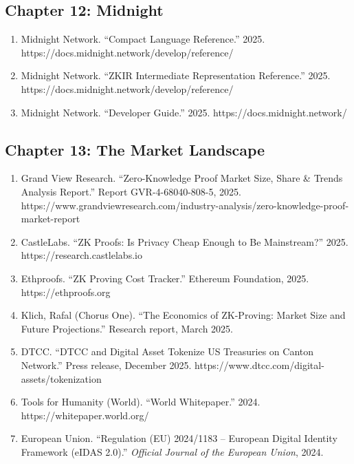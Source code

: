 \documentclass[
  11pt,
  openany]{report}
\providecommand{\tightlist}{%
  \setlength{\itemsep}{0pt}\setlength{\parskip}{0pt}}
\begin{document}
\subsection{Chapter 12: Midnight}\label{chapter-12-midnight}

\begin{enumerate}
\def\labelenumi{\arabic{enumi}.}
\setcounter{enumi}{38}
\tightlist
\item
  Midnight Network. ``Compact Language Reference.'' 2025.
  https://docs.midnight.network/develop/reference/
\item
  Midnight Network. ``ZKIR Intermediate Representation Reference.'' 2025.
  https://docs.midnight.network/develop/reference/
\item
  Midnight Network. ``Developer Guide.'' 2025. https://docs.midnight.network/
\end{enumerate}

\subsection{Chapter 13: The Market
Landscape}\label{chapter-13-the-market-landscape-1}

\begin{enumerate}
\def\labelenumi{\arabic{enumi}.}
\setcounter{enumi}{41}
\tightlist
\item
  Grand View Research. ``Zero-Knowledge Proof Market Size, Share \& Trends
  Analysis Report.'' Report GVR-4-68040-808-5, 2025.
  https://www.grandviewresearch.com/industry-analysis/zero-knowledge-proof-market-report
\item
  CastleLabs. ``ZK Proofs: Is Privacy Cheap Enough to Be Mainstream?'' 2025.
  https://research.castlelabs.io
\item
  Ethproofs. ``ZK Proving Cost Tracker.'' Ethereum Foundation, 2025.
  https://ethproofs.org
\item
  Klich, Rafal (Chorus One). ``The Economics of ZK-Proving: Market Size and
  Future Projections.'' Research report, March 2025.
\item
  DTCC. ``DTCC and Digital Asset Tokenize US Treasuries on Canton Network.''
  Press release, December 2025. https://www.dtcc.com/digital-assets/tokenization
\item
  Tools for Humanity (World). ``World Whitepaper.'' 2024.
  https://whitepaper.world.org/
\item
  European Union. ``Regulation (EU) 2024/1183 -- European Digital Identity
  Framework (eIDAS 2.0).'' \emph{Official Journal of the European Union}, 2024.
\end{enumerate}
\end{document}
